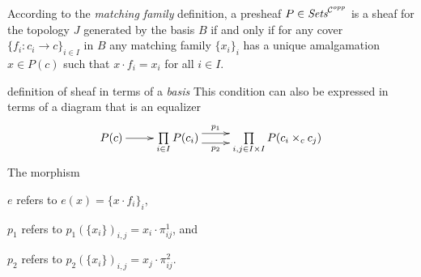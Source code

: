 \begin{frame}
According to the {\it matching family} definition, a presheaf $P \in \textit{Sets}^{{\mathcal C}^{opp}}$ is a sheaf for the topology $J$ generated by the basis $B$ if and only if for any cover $\{ f_i : c_i \rightarrow c \}_{i \in I}$ in $B$ any matching family $\{ x_i \}_i$ has a unique amalgamation $x \in P(c)$ such that $x \cdot f_i = x_i$ for all $i \in I$. 
\begin{block}{definition of sheaf in terms of a {\it basis}}
This condition can also be expressed in terms of a diagram that is an equalizer
\begin{displaymath}
\xymatrix{
P(c) \ar[r]
&
\prod\limits_{i \in I}
P(c_i)
\ar@<1ex>[r]^-{p_1} \ar@<-1ex>[r]_-{p_2}
&
\prod\limits_{i,j \in I \times I} P(c_i \times_c c_j)
}
\end{displaymath}
\noindent The morphism 

$e$ refers to $e(x) = \{ x \cdot f_i \}_i$, 

$p_1$ refers to $p_1(\{ x_i \})_{i,j} = x_i \cdot \pi_{ij}^1$, and 

$p_2$ refers to $p_2(\{x_i\})_{i,j} = x_j \cdot \pi_{ij}^{2}$.
\end{block}
\end{frame}